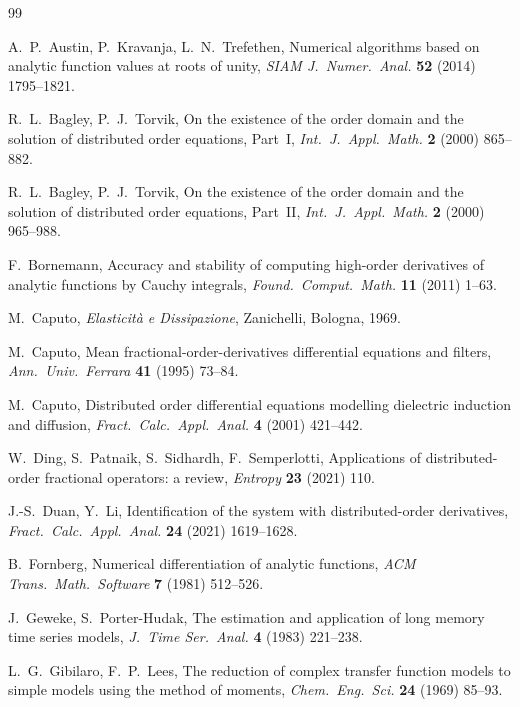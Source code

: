 \documentclass[11pt, a4paper]{article}
\theoremstyle{definition}
\theoremstyle{remark}
\begin{document}
\begin{thebibliography}{99}\small

 A.~P.~Austin, P.~Kravanja,
L.~N.~Trefethen, Numerical algorithms based on analytic function values at
roots of unity, \emph{SIAM J.\ Numer.\ Anal.} \textbf{52} (2014)
1795--1821.

 R.~L.~Bagley, P.~J.~Torvik, On the existence of
the order domain and the solution of distributed order equations, Part~I,
\emph{Int.\ J.\ Appl.\ Math.} \textbf{2} (2000) 865--882.

 R.~L.~Bagley, P.~J.~Torvik, On the existence of
the order domain and the solution of distributed order equations, Part~II,
\emph{Int.\ J.\ Appl.\ Math.} \textbf{2} (2000) 965--988.

 F.~Bornemann, Accuracy and stability of computing
high-order derivatives of analytic functions by Cauchy integrals,
\emph{Found.\ Comput.\ Math.} \textbf{11} (2011) 1--63.

 M.~Caputo, \emph{Elasticit\`a e Dissipazione},
Zanichelli, Bologna, 1969.

 M.~Caputo, Mean fractional-order-derivatives
differential equations and filters, \emph{Ann.\ Univ.\ Ferrara}
\textbf{41} (1995) 73--84.

 M.~Caputo, Distributed order differential equations
modelling dielectric induction and diffusion, \emph{Fract.\ Calc.\ Appl.\
Anal.} \textbf{4} (2001) 421--442.

 W.~Ding, S.~Patnaik, S.~Sidhardh, F.~Semperlotti,
Applications of distributed-order fractional operators: a review,
\emph{Entropy} \textbf{23} (2021) 110.

 J.-S.~Duan, Y.~Li, Identification of the system with
distributed-order derivatives, \emph{Fract.\ Calc.\ Appl.\ Anal.}
\textbf{24} (2021) 1619--1628.

 B.~Fornberg, Numerical differentiation of analytic
functions, \emph{ACM Trans.\ Math.\ Software} \textbf{7} (1981) 512--526.

 J.~Geweke, S.~Porter-Hudak, The estimation
and application of long memory time series models, \emph{J.\ Time Ser.\
Anal.} \textbf{4} (1983) 221--238.

 L.~G.~Gibilaro, F.~P.~Lees, The reduction of
complex transfer function models to simple models using the method of
moments, \emph{Chem.\ Eng.\ Sci.} \textbf{24} (1969) 85--93.


\end{thebibliography}
\end{document}
